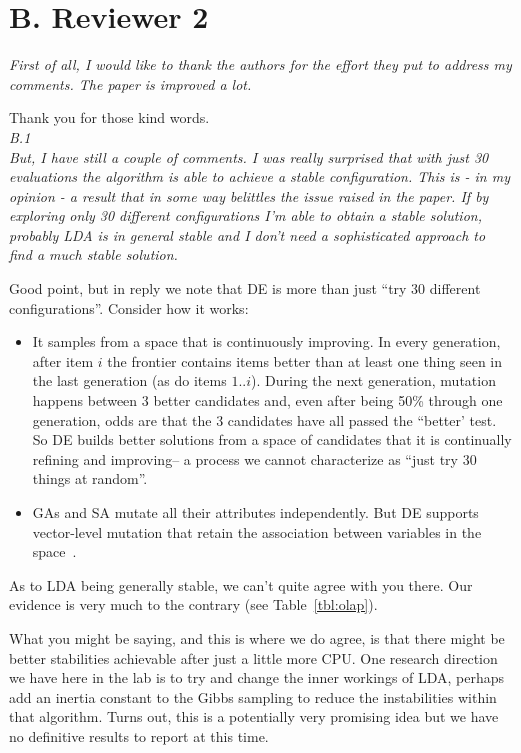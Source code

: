 \documentclass[twocolumn,5p,sort&compress]{elsarticle}
\newcommand{\bi}{\begin{itemize}}
\newcommand{\ei}{\end{itemize}}
\theoremstyle{break}
\begin{document}
\newpage
\section*{B. Reviewer 2}

\textit{First of all, I would like to thank the authors for the effort they put to address my comments. The paper is improved a lot.\\}

Thank you for those kind words.\\

\textit{B.1\\}
{\em But, I have still a couple of comments.
I was really surprised that with just 30 evaluations the algorithm is able to achieve a stable configuration. This is - in my opinion - a result that in some way belittles the issue raised in the paper. If by exploring only 30 different configurations I’m able to obtain a stable solution, probably LDA is in general stable and I don’t need a sophisticated approach to find a much stable solution.\\}

Good point, but in reply we note that DE is more
than just ``try 30 different configurations''. Consider
how it works: 
\bi
\item It samples from a space that is continuously improving. In every generation, after item $i$ the frontier contains   items
  better than at least one thing
seen in the last generation (as do  items $1..i$).   During the next generation, mutation happens between 3 better candidates
and, even after being 50\% through one generation,
odds are that the 3 candidates have all passed the ``better'
test. So DE builds better solutions
from a space of candidates that it is continually
refining and improving-- a process we cannot characterize
as ``just try 30 things at random''.
\item GAs and SA mutate all their
attributes independently. But DE  supports vector-level mutation that retain the association between variables in the space~\cite{das2011differential}.\\
\ei
As to LDA being generally stable, we can't quite agree with you there. Our evidence is very much to the contrary (see 
Table~\ref{tbl:olap}).

What you might be saying, and this is where we do agree,
is that there might be better stabilities achievable after
just a little more CPU. One research direction we have
here in the lab is to try and change the inner workings
of LDA, perhaps add an inertia constant to the Gibbs sampling
to reduce the instabilities within that algorithm. 
Turns out, this is a potentially very promising idea
but we have no definitive results to report at this time.
\end{document}
